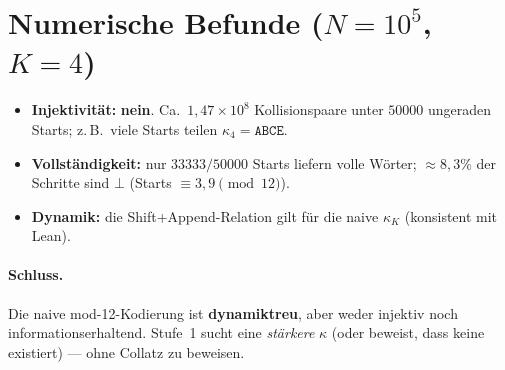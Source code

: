 \documentclass[11pt,a4paper]{article}
\begin{document}
\section{Numerische Befunde ($N=10^5$, $K=4$)}

\begin{itemize}
  \item \textbf{Injektivität:} \textbf{nein}. Ca.\ $1{,}47\times 10^8$ Kollisionspaare unter $50000$ ungeraden Starts; z.\,B.\ viele Starts teilen $\kappa_4=\texttt{ABCE}$.
  \item \textbf{Vollständigkeit:} nur $33333/50000$ Starts liefern volle Wörter; $\approx 8{,}3\%$ der Schritte sind $\bot$ (Starts $\equiv 3,9\pmod{12}$).
  \item \textbf{Dynamik:} die Shift+Append-Relation gilt für die naive $\kappa_K$ (konsistent mit Lean).
\end{itemize}

\paragraph{Schluss.}
Die naive mod-12-Kodierung ist \textbf{dynamiktreu}, aber weder injektiv noch informationserhaltend.
Stufe~1 sucht eine \emph{stärkere} $\kappa$ (oder beweist, dass keine existiert) --- ohne Collatz zu beweisen.
\end{document}
